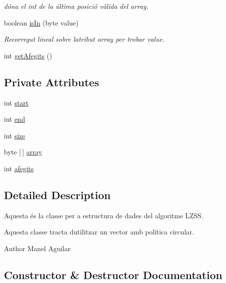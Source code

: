 \begin{DoxyCompactItemize}
\begin{DoxyCompactList}\small\item\em dóna el int de la última posició vàlida del array. \end{DoxyCompactList}\item 
boolean \hyperlink{classdomini_1_1utils_1_1ArrayCircular_aaf106d070b5937f2559a56257dc8cac3}{is\+In} (byte value)
\begin{DoxyCompactList}\small\item\em Recorregut lineal sobre l\textquotesingle{}atribut array per trobar value. \end{DoxyCompactList}\item 
int \hyperlink{classdomini_1_1utils_1_1ArrayCircular_a1c65dd3b452fa82ab8827885a7a2fbe1}{get\+Afegits} ()
\end{DoxyCompactItemize}
\subsection*{Private Attributes}
\begin{DoxyCompactItemize}
\item 
int \hyperlink{classdomini_1_1utils_1_1ArrayCircular_a5206ac4a02c25c16c8a8ed50f65ea87b}{start}
\item 
int \hyperlink{classdomini_1_1utils_1_1ArrayCircular_ad3f40ecb62a2503382fa5d1fa2025912}{end}
\item 
int \hyperlink{classdomini_1_1utils_1_1ArrayCircular_a1ffca5e28ff4dc515eddde9cd5926efd}{size}
\item 
byte \mbox{[}$\,$\mbox{]} \hyperlink{classdomini_1_1utils_1_1ArrayCircular_a2af77a58adf605b58d79a1879a0a593f}{array}
\item 
int \hyperlink{classdomini_1_1utils_1_1ArrayCircular_a08291d877b2d4c71c219df6f983b279a}{afegits}
\end{DoxyCompactItemize}


\subsection{Detailed Description}
Aquesta és la classe per a estructura de dades del algoritme L\+Z\+SS. 

Aquesta classe tracta d\textquotesingle{}utilitzar un vector amb política circular.

\begin{DoxyAuthor}{Author}
Manel Aguilar 
\end{DoxyAuthor}


\subsection{Constructor \& Destructor Documentation}
\mbox{\label{classdomini_1_1utils_1_1ArrayCircular_add69c3bd37b2a3ef6069bd3b5df93fec}} 
